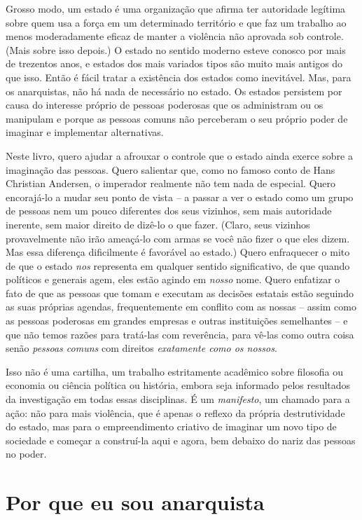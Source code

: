 Grosso modo, um estado é uma organização que afirma ter autoridade legítima sobre quem usa a força em um determinado território e que faz um trabalho ao menos moderadamente eficaz de manter a violência não aprovada sob controle. (Mais sobre isso depois.) O estado no sentido moderno esteve conosco por mais de trezentos anos, e estados dos mais variados tipos são muito mais antigos do que isso. Então é fácil tratar a existência dos estados como inevitável. Mas, para os anarquistas, não há nada de necessário no estado. Os estados persistem por causa do interesse próprio de pessoas poderosas que os administram ou os manipulam e porque as pessoas comuns não perceberam o seu próprio poder de imaginar e implementar alternativas.

Neste livro, quero ajudar a afrouxar o controle que o estado ainda exerce sobre a imaginação das pessoas. Quero salientar que, como no famoso conto de Hans Christian Andersen, o imperador realmente não tem nada de especial. Quero encorajá-lo a mudar seu ponto de vista -- a passar a ver o estado como um grupo de pessoas nem um pouco diferentes dos seus vizinhos, sem mais autoridade inerente, sem maior direito de dizê-lo o que fazer. (Claro, seus vizinhos provavelmente não irão ameaçá-lo com armas se você não fizer o que eles dizem. Mas essa diferença dificilmente é favorável ao estado.) Quero enfraquecer o mito de que o estado \emph{nos} representa em qualquer sentido significativo, de que quando políticos e generais agem, eles estão agindo em \emph{nosso} nome. Quero enfatizar o fato de que as pessoas que tomam e executam as decisões estatais estão seguindo as suas próprias agendas, frequentemente em conflito com as nossas -- assim como as pessoas poderosas em grandes empresas e outras instituições semelhantes -- e que não temos razões para tratá-las com reverência, para vê-las como outra coisa senão \emph{pessoas comuns} com direitos \emph{exatamente como os nossos}.

Isso não é uma cartilha, um trabalho estritamente acadêmico sobre filosofia ou economia ou ciência política ou história, embora seja informado pelos resultados da investigação em todas essas disciplinas. É um \emph{manifesto}, um chamado para a ação: não para mais violência, que é apenas o reflexo da própria destrutividade do estado, mas para o empreendimento criativo de imaginar um novo tipo de sociedade e começar a construí-la aqui e agora, bem debaixo do nariz das pessoas no poder.

\section{Por que eu sou anarquista}

